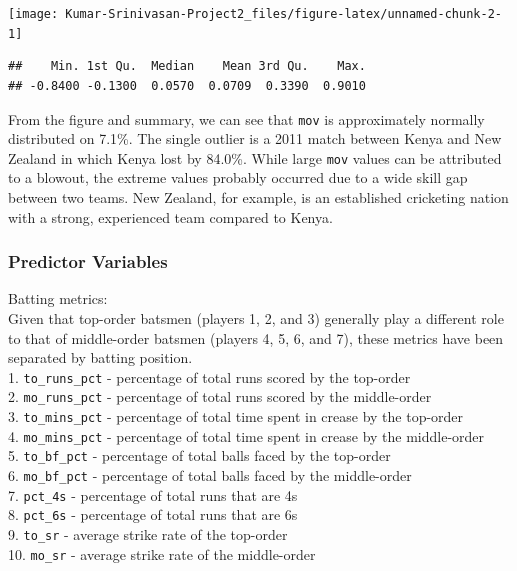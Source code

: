 \documentclass[
]{article}
\begin{document}
\texttt{[image: Kumar-Srinivasan-Project2\_files/figure-latex/unnamed-chunk-2-1]}

\begin{verbatim}
##    Min. 1st Qu.  Median    Mean 3rd Qu.    Max. 
## -0.8400 -0.1300  0.0570  0.0709  0.3390  0.9010
\end{verbatim}

From the figure and summary, we can see that \texttt{mov} is
approximately normally distributed on 7.1\%. The single outlier is a
2011 match between Kenya and New Zealand in which Kenya lost by 84.0\%.
While large \texttt{mov} values can be attributed to a blowout, the
extreme values probably occurred due to a wide skill gap between two
teams. New Zealand, for example, is an established cricketing nation
with a strong, experienced team compared to Kenya.

\hypertarget{predictor-variables}{%
\subsubsection{Predictor Variables}\label{predictor-variables}}

Batting metrics:\\
Given that top-order batsmen (players 1, 2, and 3) generally play a
different role to that of middle-order batsmen (players 4, 5, 6, and 7),
these metrics have been separated by batting position.\\
1. \texttt{to\_runs\_pct} - percentage of total runs scored by the
top-order\\
2. \texttt{mo\_runs\_pct} - percentage of total runs scored by the
middle-order\\
3. \texttt{to\_mins\_pct} - percentage of total time spent in crease by
the top-order\\
4. \texttt{mo\_mins\_pct} - percentage of total time spent in crease by
the middle-order\\
5. \texttt{to\_bf\_pct} - percentage of total balls faced by the
top-order\\
6. \texttt{mo\_bf\_pct} - percentage of total balls faced by the
middle-order\\
7. \texttt{pct\_4s} - percentage of total runs that are 4s\\
8. \texttt{pct\_6s} - percentage of total runs that are 6s\\
9. \texttt{to\_sr} - average strike rate of the top-order\\
10. \texttt{mo\_sr} - average strike rate of the middle-order\\
\end{document}
